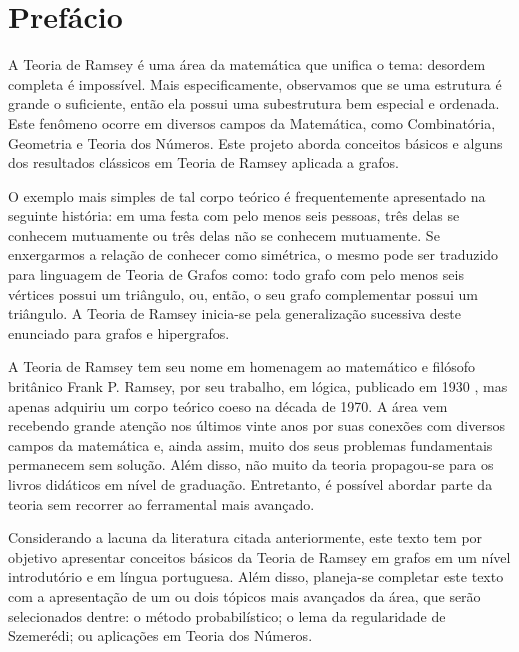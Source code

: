 
\chapter{Prefácio}

A Teoria de Ramsey é uma área da matemática que unifica o tema: desordem completa é impossível. Mais especificamente, observamos que se uma estrutura é grande o suficiente, então ela possui uma subestrutura bem especial e ordenada. Este fenômeno ocorre em diversos campos da Matemática, como Combinatória, Geometria e Teoria dos Números. Este projeto aborda conceitos básicos e alguns dos resultados clássicos em Teoria de Ramsey aplicada a grafos.

O exemplo mais simples de tal corpo teórico é frequentemente apresentado na seguinte história: em uma festa com pelo menos seis pessoas, três delas se conhecem mutuamente ou três delas não se conhecem mutuamente. Se enxergarmos a relação de conhecer como simétrica, o mesmo pode ser traduzido para linguagem de Teoria de Grafos como: todo grafo com pelo menos seis vértices possui um triângulo, ou, então, o seu grafo complementar possui um triângulo. A Teoria de Ramsey inicia-se pela generalização sucessiva deste enunciado para grafos e hipergrafos.

A Teoria de Ramsey tem seu nome em homenagem ao matemático e filósofo britânico Frank P. Ramsey, por seu trabalho, em lógica, publicado em 1930 \cite{ramsey}, mas apenas adquiriu um corpo teórico coeso na década de 1970. A área vem recebendo grande atenção nos últimos vinte anos por suas conexões com diversos campos da matemática e, ainda assim, muito dos seus problemas fundamentais permanecem sem solução. Além disso, não muito da teoria propagou-se para os livros didáticos em nível de graduação. Entretanto, é possível abordar parte da teoria sem recorrer ao ferramental mais avançado.

Considerando a lacuna da literatura citada anteriormente, este texto tem por objetivo apresentar conceitos básicos da Teoria de Ramsey em grafos em um nível introdutório e em língua portuguesa. Além disso, planeja-se completar este texto com a apresentação de um ou dois tópicos mais avançados da área, que serão selecionados dentre: o método probabilístico; o lema da regularidade de Szemerédi; ou aplicações em Teoria dos Números.

